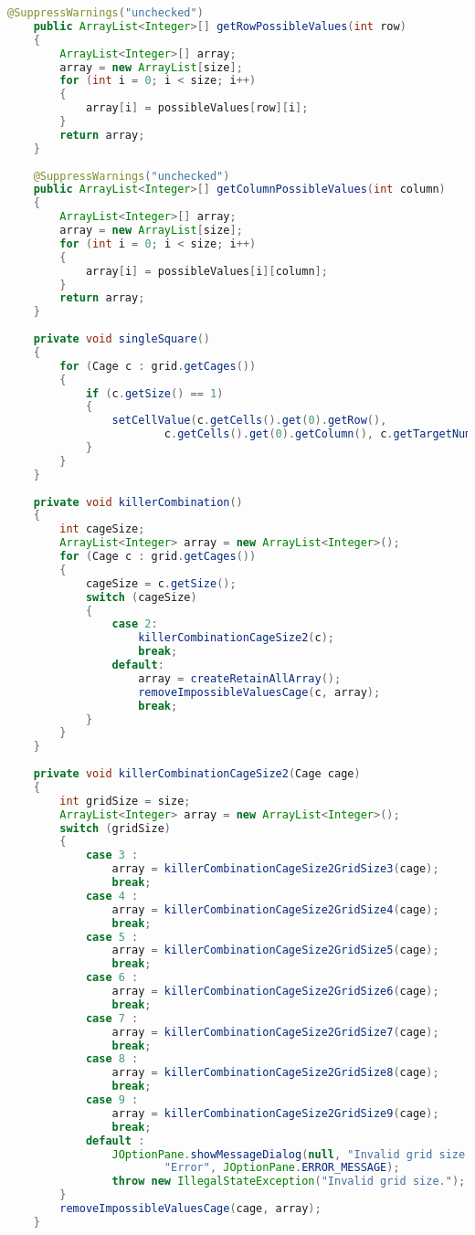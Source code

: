 \begin{lstlisting}[language=Java,basicstyle=\tiny,caption=SolverRuleBased.java]
    @SuppressWarnings("unchecked")
	public ArrayList<Integer>[] getRowPossibleValues(int row)
    {
        ArrayList<Integer>[] array;
        array = new ArrayList[size];
        for (int i = 0; i < size; i++)
        {
            array[i] = possibleValues[row][i];
        }
        return array;
    }
    
    @SuppressWarnings("unchecked")
	public ArrayList<Integer>[] getColumnPossibleValues(int column)
    {
        ArrayList<Integer>[] array;
        array = new ArrayList[size];
        for (int i = 0; i < size; i++)
        {
            array[i] = possibleValues[i][column];
        }
        return array;
    }
    
    private void singleSquare()
    {
        for (Cage c : grid.getCages())
        {
            if (c.getSize() == 1)
            {
                setCellValue(c.getCells().get(0).getRow(), 
                        c.getCells().get(0).getColumn(), c.getTargetNumber());
            }
        }
    }
    
    private void killerCombination()
    {
        int cageSize;
        ArrayList<Integer> array = new ArrayList<Integer>();
        for (Cage c : grid.getCages())
        {
            cageSize = c.getSize();
            switch (cageSize)
            {
                case 2:
                    killerCombinationCageSize2(c);
                    break;
                default:
                    array = createRetainAllArray();
                    removeImpossibleValuesCage(c, array);
                    break;
            }
        }
    }
    
    private void killerCombinationCageSize2(Cage cage)
    {
        int gridSize = size;
        ArrayList<Integer> array = new ArrayList<Integer>();
        switch (gridSize)
        {
            case 3 :
                array = killerCombinationCageSize2GridSize3(cage);
                break;
            case 4 :
                array = killerCombinationCageSize2GridSize4(cage);
                break;
            case 5 :
                array = killerCombinationCageSize2GridSize5(cage);
                break;
            case 6 :
                array = killerCombinationCageSize2GridSize6(cage);
                break;
            case 7 :
                array = killerCombinationCageSize2GridSize7(cage);
                break;
            case 8 :
                array = killerCombinationCageSize2GridSize8(cage);
                break;
            case 9 :
                array = killerCombinationCageSize2GridSize9(cage);
                break;
            default :
                JOptionPane.showMessageDialog(null, "Invalid grid size.", 
                        "Error", JOptionPane.ERROR_MESSAGE);
                throw new IllegalStateException("Invalid grid size.");
        }
        removeImpossibleValuesCage(cage, array);
    }


\end{lstlisting}
